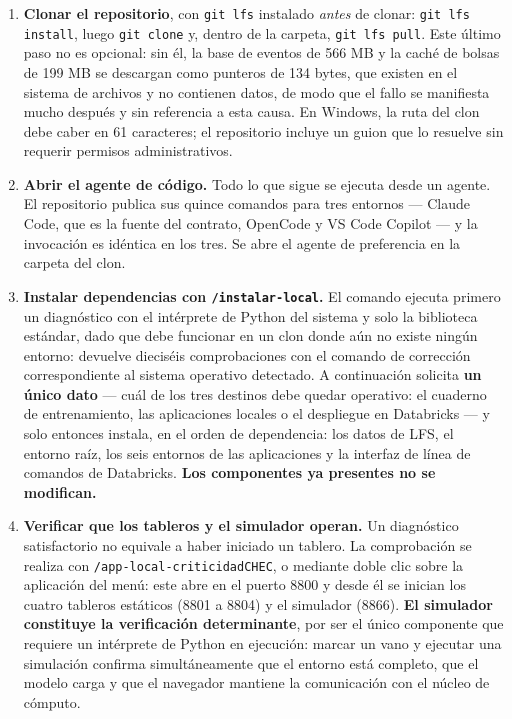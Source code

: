 \documentclass[11pt,a4paper]{article}
\begin{document}
\begin{enumerate}
  \item \textbf{Clonar el repositorio}, con \texttt{git lfs} instalado \emph{antes} de clonar:
        \texttt{git lfs install}, luego \texttt{git clone} y, dentro de la carpeta,
        \texttt{git lfs pull}. Este último paso no es opcional: sin él, la base de eventos de
        566 MB y la caché de bolsas de 199 MB se descargan como punteros de 134 bytes, que
        existen en el sistema de archivos y no contienen datos, de modo que el fallo se
        manifiesta mucho después y sin referencia a esta causa. En Windows, la ruta del clon
        debe caber en 61 caracteres; el repositorio incluye un guion que lo resuelve sin
        requerir permisos administrativos.

  \item \textbf{Abrir el agente de código.} Todo lo que sigue se ejecuta desde un agente. El
        repositorio publica sus quince comandos para tres entornos --- Claude Code, que es la
        fuente del contrato, OpenCode y VS Code Copilot --- y la invocación es idéntica en los
        tres. Se abre el agente de preferencia en la carpeta del clon.

  \item \textbf{Instalar dependencias con \texttt{/instalar-local}.} El comando ejecuta primero
        un diagnóstico con el intérprete de Python del sistema y solo la biblioteca estándar,
        dado que debe funcionar en un clon donde aún no existe ningún entorno: devuelve
        dieciséis comprobaciones con el comando de corrección correspondiente al sistema
        operativo detectado. A continuación solicita \textbf{un único dato} --- cuál de los tres
        destinos debe quedar operativo: el cuaderno de entrenamiento, las aplicaciones locales o
        el despliegue en Databricks --- y solo entonces instala, en el orden de dependencia: los
        datos de LFS, el entorno raíz, los seis entornos de las aplicaciones y la interfaz de
        línea de comandos de Databricks. \textbf{Los componentes ya presentes no se modifican.}

  \item \textbf{Verificar que los tableros y el simulador operan.} Un diagnóstico satisfactorio
        no equivale a haber iniciado un tablero. La comprobación se realiza con
        \texttt{/app-local-criticidadCHEC}, o mediante doble clic sobre la aplicación del menú:
        este abre en el puerto 8800 y desde él se inician los cuatro tableros estáticos (8801 a
        8804) y el simulador (8866). \textbf{El simulador constituye la verificación
        determinante}, por ser el único componente que requiere un intérprete de Python en
        ejecución: marcar un vano y ejecutar una simulación confirma simultáneamente que el
        entorno está completo, que el modelo carga y que el navegador mantiene la comunicación
        con el núcleo de cómputo.


\end{enumerate}
\end{document}
